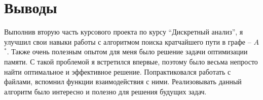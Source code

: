 \section{Выводы}
Выполнив вторую часть курсового проекта по курсу \enquote{Дискретный анализ}, я улучшил свои навыки работы с алгоритмом поиска кратчайшего пути в графе -- $A$$^*$. Также очень полезным опытом для меня было решение задачи оптимизации памяти. С такой проблемой я встретился впервые, поэтому было весьма непросто найти оптимальное и эффективное решение. Попрактиковался работать с файлами, вспомнил функции взаимодействия с ними. Реализовывать данный алгоритм было интересно и полезно для решения будущих задач.
\pagebreak
